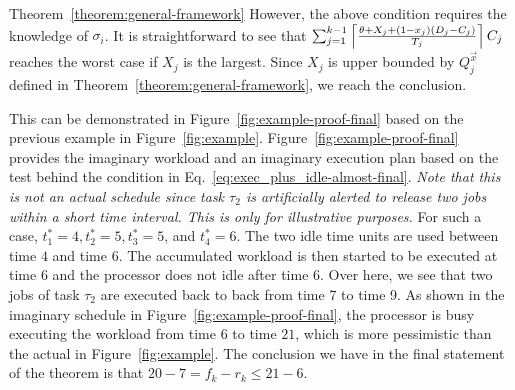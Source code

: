 \begin{appProof}{Theorem~\ref{theorem:general-framework}}
However, the above condition requires the knowledge of $\sigma_i$. It is straightforward to see that $\sum_{j=1}^{k-1} \left\lceil{\frac{\theta+X_j+(1-x_j)(D_j-C_j)}{T_j}}\right\rceil C_j$ reaches the worst case if $X_j$ is the largest. Since $X_j$ is upper bounded by $Q_j^{\vec{x}}$ defined in Theorem~\ref{theorem:general-framework}, we reach the conclusion.

\begin{example}
This can
be demonstrated in Figure~\ref{fig:example-proof-final} based on the
previous example in
Figure~\ref{fig:example}. Figure~\ref{fig:example-proof-final}
provides the imaginary workload and an imaginary execution plan based
on the test behind the condition in
Eq.~\eqref{eq:exec_plus_idle-almost-final}. \emph{Note that this is
  not an actual schedule since task $\tau_2$ is artificially alerted
  to release two jobs within a short time interval. This is only for
  illustrative purposes.}
For such a case, $t_1^*=4,
t_2^*=5, t_3^*=5$, and $t_4^*=6$. The two idle time units are used
between time $4$ and time $6$. The accumulated workload is then
started to be executed at time $6$ and the processor does not
idle after time $6$. Over here, we see that two jobs of task $\tau_2$ are executed
back to back from time 7 to time 9. As
shown in the imaginary schedule in
Figure~\ref{fig:example-proof-final}, the processor is busy executing
the workload from time $6$ to time $21$, which is more pessimistic
than the actual in Figure~\ref{fig:example}. The conclusion we have in the final statement of the theorem is that $20-7=f_k-r_k \leq 21-6$.
\end{example}

\end{appProof}


